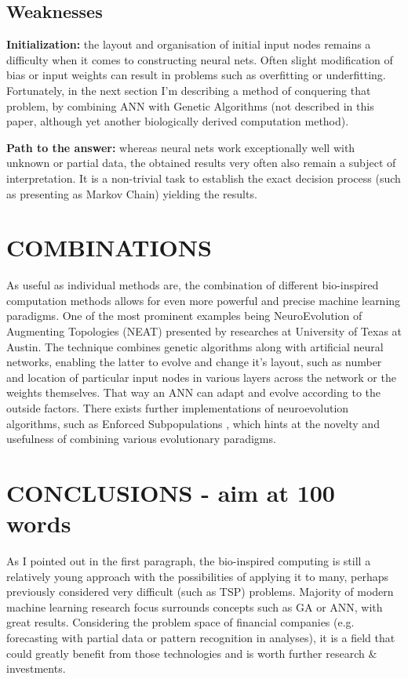 \documentclass[letterpaper, 10 pt, conference]{ieeeconf}  %
\begin{document}
\subsection{Weaknesses}
\textbf{Initialization:} the layout and organisation of initial input nodes remains a difficulty when it comes to constructing neural nets. Often slight modification of bias or input weights can result in problems such as overfitting or underfitting. Fortunately, in the next section I'm describing a method of conquering that problem, by combining ANN with Genetic Algorithms (not described in this paper, although yet another biologically derived computation method).

\textbf{Path to the answer:} whereas neural nets work exceptionally well with unknown or partial data, the obtained results very often also remain a subject of interpretation. It is a non-trivial task to establish the exact decision process (such as presenting as Markov Chain) yielding the results.

\section{COMBINATIONS}

As useful as individual methods are, the combination of different bio-inspired computation methods allows for even more powerful and precise machine learning paradigms. One of the most prominent examples being NeuroEvolution of Augmenting Topologies (NEAT) \cite{stanley2002evolving} presented by researches at University of Texas at Austin. The technique combines genetic algorithms along with artificial neural networks, enabling the latter to evolve and change it's layout, such as number and location of particular input nodes in various layers across the network or the weights themselves. That way an ANN can adapt and evolve according to the outside factors. There exists further implementations of neuroevolution algorithms, such as Enforced Subpopulations \cite{ha2015esp}, which hints at the novelty and usefulness of combining various evolutionary paradigms.

\section{CONCLUSIONS - aim at 100 words}

As I pointed out in the first paragraph, the bio-inspired computing is still a relatively young approach with the possibilities of applying it to many, perhaps previously considered very difficult (such as TSP) problems. Majority of modern machine learning research focus surrounds concepts such as GA or ANN, with great results. Considering the problem space of financial companies (e.g. forecasting with partial data or pattern recognition in analyses), it is a field that could greatly benefit from those technologies and is worth further research \& investments.
\end{document}
